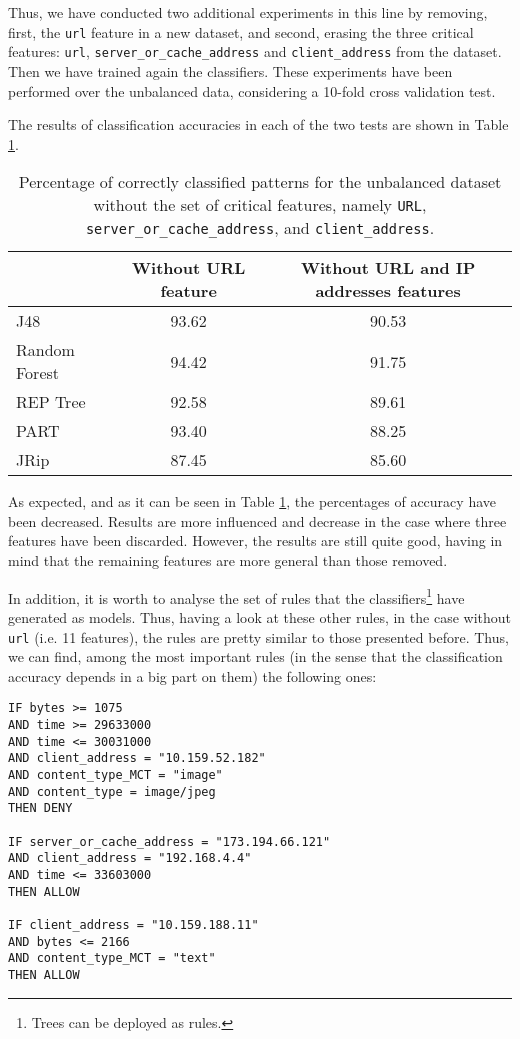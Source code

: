 \documentclass{llncs}
\begin{document}
Thus, we have conducted two additional experiments in this line by removing, first, the \texttt{url} feature in a new dataset, and second, erasing the three critical features: \texttt{url}, \texttt{server\_or\_cache\_address} and \texttt{client\_address} from the dataset. Then we have trained again the classifiers. These experiments have been performed over the unbalanced data, considering a 10-fold cross validation test.

The results of classification accuracies in each of the two tests are shown in Table \ref{tab_rules_study_classification}.

\begin{table}[htpb]
\centering
 \caption{\label{tab_rules_study_classification} Percentage of correctly classified patterns for the unbalanced dataset without the set of critical features, namely \texttt{URL}, \texttt{server\_or\_cache\_address}, and \texttt{client\_address}.}
{\small
\begin{tabular}{|l|c|c|}
\cline{2-3}
\multicolumn{1}{l|}{} & Without URL feature & Without URL and IP addresses features\\
\hline
J48 & 93.62 & 90.53 \\
\cline{1-1}
Random Forest & 94.42 & 91.75 \\
\cline{1-1}
REP Tree & 92.58 & 89.61 \\
\cline{1-1}
PART & 93.40 & 88.25 \\
\cline{1-1}
JRip & 87.45 & 85.60 \\
\hline
\end{tabular}
}
\end{table}

As expected, and as it can be seen in Table \ref{tab_rules_study_classification}, the percentages of accuracy have been decreased. Results are more influenced and decrease in the case where three features have been discarded. However, the results are still quite good, having in mind that the remaining features are more general than those removed. 

In addition, it is worth to analyse the set of rules that the classifiers\footnote{Trees can be deployed as rules.} have generated as models. Thus, having a look at these other rules, in the case without \texttt{url} (i.e. 11 features), the rules are pretty similar to those presented before. Thus, we can find, among the most important rules (in the sense that the classification accuracy depends in a big part on them) the following ones:

\begin{small}
\begin{verbatim}
IF bytes >= 1075
AND time >= 29633000
AND time <= 30031000
AND client_address = "10.159.52.182"
AND content_type_MCT = "image"
AND content_type = image/jpeg
THEN DENY

IF server_or_cache_address = "173.194.66.121"
AND client_address = "192.168.4.4"
AND time <= 33603000
THEN ALLOW

IF client_address = "10.159.188.11"
AND bytes <= 2166
AND content_type_MCT = "text"
THEN ALLOW
\end{verbatim}
\end{small}
\end{document}
